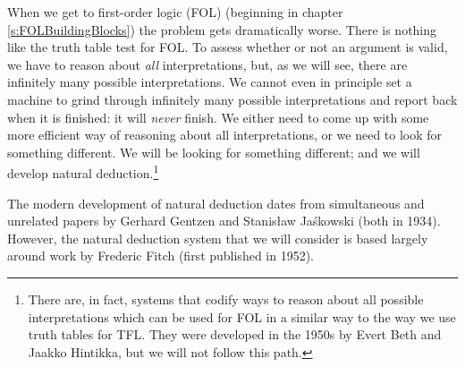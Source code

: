 When we get to first-order logic (FOL) (beginning in chapter \ref{s:FOLBuildingBlocks}) the problem gets dramatically worse. There is nothing like the truth table test for FOL. To assess whether or not an argument is valid, we have to reason about \emph{all} interpretations, but, as we will see, there are infinitely many possible interpretations. We cannot even in principle set a machine to grind through infinitely many possible interpretations and report back when it is finished: it will \emph{never} finish. We either need to come up with some more efficient way of reasoning about all interpretations, or we need to look for something different. We will be looking for something different; and we will develop natural deduction.\footnote{There are, in fact, systems that codify ways to reason about all possible interpretations which can be used for FOL in a similar way to the way we use truth tables for TFL. They were developed in the 1950s by Evert Beth and Jaakko Hintikka, but we will not follow this path.}
%
%
%



The modern development of natural deduction dates from simultaneous and unrelated papers by Gerhard Gentzen and Stanis\l{}aw Ja\'{s}kowski (both in 1934). However, the natural deduction system that we will consider is based largely around work by Frederic Fitch (first published in 1952).



